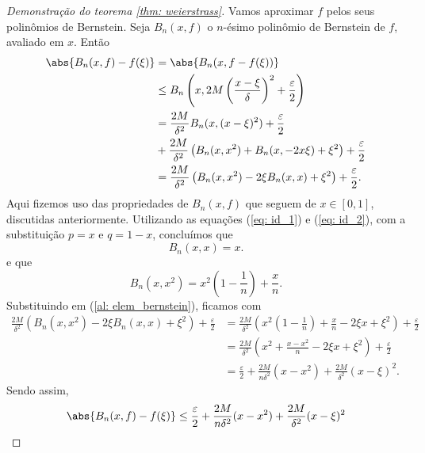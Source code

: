 \begin{proof}[Demonstração do teorema \ref{thm: weierstrass}]
    Vamos aproximar \( f \) pelos seus polinômios de Bernstein.
    Seja \( B_{ n }(x, f) \) o \( n \)-ésimo polinômio de Bernstein de \( f \), avaliado em \( x \).
    Então
    \begin{align}
        \abs{ B_{ n } (x, f) - f(\xi) }
        &= \abs{B_{ n } (x, f - f(\xi))} \\
        &\leq  B_{ n } \left( x, 2M \left( \frac{ x - \xi }{ \delta } \right)^2 + \frac{ \varepsilon }{ 2 } \right) \\
        &= \frac{ 2M }{ \delta^2 } B_{ n } (x, ( x - \xi )^2) + \frac{ \varepsilon }{ 2 } \\
        &+ \frac{ 2M }{ \delta^2 } \left( B_{ n } (x, x^2) + B_{ n } (x, -2 x \xi) + \xi^2 \right) + \frac{ \varepsilon }{ 2 } \\
        &= \frac{ 2M }{ \delta^2 } \left( B_{ n } (x, x^2) - 2 \xi B_{ n } (x, x) + \xi^2 \right) + \frac{ \varepsilon }{ 2 }
        \label{al: elem_bernstein}
    .\end{align}
    Aqui fizemos uso das propriedades de \( B_{ n } (x, f) \) que seguem de \( x \in [0, 1] \), discutidas anteriormente.
    Utilizando as equações (\ref{eq: id_1}) e (\ref{eq: id_2}), com a substituição \( p = x \) e \( q = 1 - x \), concluímos que
    \begin{equation}
        B_{ n } (x, x) = x
    .\end{equation}
    e que
    \begin{equation}
        B_{ n } (x, x^2) = x^2 \left( 1 - \frac{ 1 }{ n } \right) + \frac{ x }{ n }
    .\end{equation}
    Substituindo em (\ref{al: elem_bernstein}), ficamos com
    \begin{align}
        \frac{ 2M }{ \delta^2 } \left( B_{ n } (x, x^2) - 2 \xi B_{ n } (x, x) + \xi^2 \right) + \frac{ \varepsilon }{ 2 } &=
        \frac{ 2M }{ \delta^2 } \left( 
            x^2 \left( 1 - \frac{ 1 }{ n } \right) + \frac{ x }{ n }
            - 2 \xi x
            + \xi^2
         \right) + \frac{ \varepsilon }{ 2 } \\
         &= \frac{ 2M }{ \delta^2 } \left( 
             x^2 + \frac{ x - x^2 }{ n } - 2 \xi x + \xi^2
          \right) + \frac{ \varepsilon }{ 2 } \\
         &= \frac{ \varepsilon }{ 2 } + \frac{ 2M }{ n \delta^2 } ( x - x^2 ) + \frac{ 2M }{ \delta^2 } ( x - \xi )^2
    .\end{align}
    Sendo assim, 
    \begin{equation}
        \abs{ B_{ n } (x, f) - f(\xi) } \leq \frac{ \varepsilon }{ 2 } + \frac{ 2M }{ n \delta^2 } ( x - x^2 ) + \frac{ 2M }{ \delta^2 } ( x - \xi )^2

\end{equation}
\end{proof}
